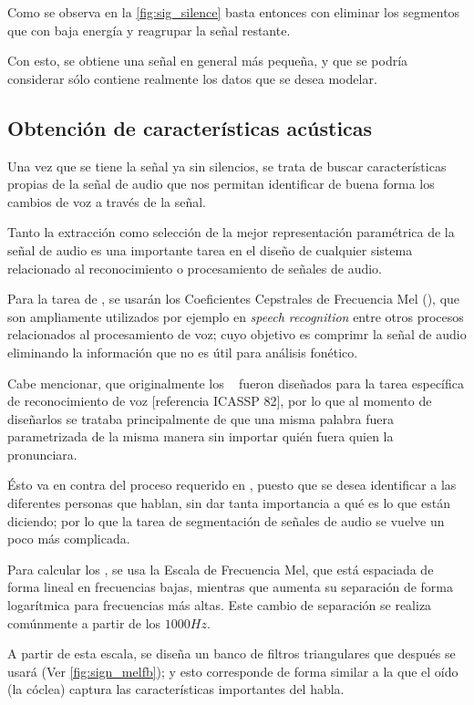Como se observa en la \autoref{fig:sig_silence} basta entonces con eliminar los segmentos que con baja energía y reagrupar la señal restante.

Con esto, se obtiene una señal en general más pequeña, y que se podría  considerar sólo contiene realmente los datos que se desea modelar.

\subsection{Obtención de características acústicas}

Una vez que se tiene la señal ya sin silencios, se trata de buscar características propias de la señal de audio que nos permitan identificar de buena forma los cambios de voz a través de la señal.

Tanto la extracción como selección de la mejor representación paramétrica de la señal de audio es una importante tarea en el diseño de cualquier sistema relacionado al reconocimiento o procesamiento de señales de audio. 

Para la tarea de \sd, se usarán los Coeficientes Cepstrales de Frecuencia Mel  (\MFCC), que son ampliamente utilizados por ejemplo en \textit{speech recognition} entre otros procesos relacionados al procesamiento de voz; cuyo objetivo es comprimr la señal de audio eliminando la información que no es útil para análisis fonético.

Cabe mencionar, que originalmente los \MFCC~ fueron diseñados para la tarea específica de reconocimiento de voz [referencia ICASSP 82], por lo que al momento de diseñarlos se trataba principalmente de que una misma palabra  fuera parametrizada de la misma manera sin importar quién fuera quien la pronunciara. 

Ésto va en contra del proceso requerido en \sd, puesto que se desea identificar a las diferentes personas que hablan, sin dar tanta importancia a qué es lo que están diciendo; por lo que la tarea de segmentación de señales de audio se vuelve un poco más complicada.

Para calcular los \MFCC, se usa la Escala de Frecuencia Mel, que está espaciada de forma lineal en frecuencias bajas, mientras que aumenta su separación de forma logarítmica para frecuencias más altas. Este cambio de separación se realiza comúnmente a partir de los $1000Hz$. 

A partir de esta escala, se diseña un banco de filtros triangulares que después se usará (Ver \autoref{fig:sign_melfb}); y esto corresponde de forma similar a la que el oído (la cóclea) captura las características importantes del habla. 

